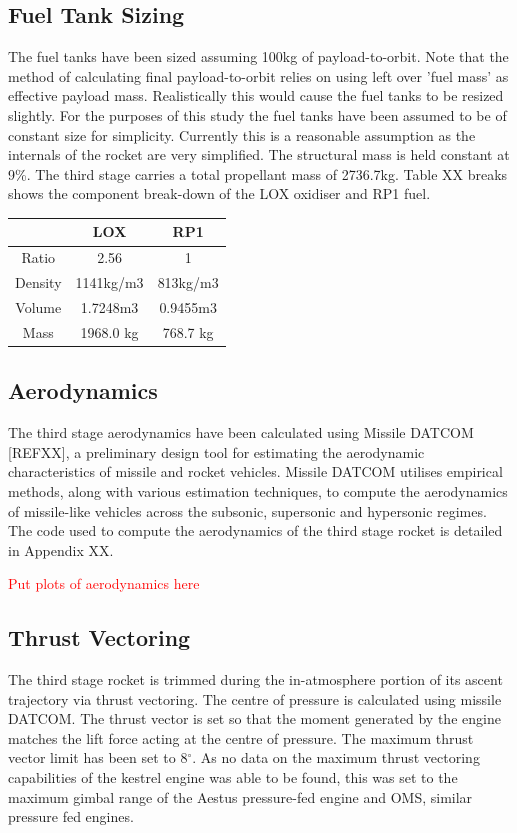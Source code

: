 		\subsection{Fuel Tank Sizing}
		The fuel tanks have been sized assuming 100kg of payload-to-orbit. Note that the method of calculating final payload-to-orbit relies on using left over 'fuel mass' as effective payload mass. Realistically this would cause the fuel tanks to be resized slightly. For the purposes of this study the fuel tanks have been assumed to be of constant size for simplicity. Currently this is a reasonable assumption as the internals of the rocket are very simplified. The structural mass is held constant at 9\%. The third stage carries a total propellant mass of 2736.7kg. Table XX breaks shows the component break-down of the LOX oxidiser and RP1 fuel.  
		
\begin{tabular}{|c|c|c|}
	\hline  & \textbf{LOX} & \textbf{RP1} \\ 
	\hline Ratio & 2.56 & 1 \\ 
	\hline Density & 1141kg/m3 & 813kg/m3 \cite{Magee}\\ 
	\hline Volume & 1.7248m3 & 0.9455m3 \\ 
	\hline Mass & 1968.0 kg & 768.7 kg \\ 
	\hline 
\end{tabular} 
		
		
		
		
		
		
		\subsection{Aerodynamics}
		
		The third stage aerodynamics have been calculated using Missile DATCOM [REFXX], a preliminary design tool for estimating the aerodynamic characteristics of missile and rocket vehicles. Missile DATCOM utilises empirical methods, along with various estimation techniques, to compute the aerodynamics of missile-like vehicles across the subsonic, supersonic and hypersonic regimes.  The code used to compute the aerodynamics of the third stage rocket is detailed in Appendix XX.  
		
		\textcolor{red}{Put plots of aerodynamics here}
		
		\subsection{Thrust Vectoring}
		
		The third stage rocket is trimmed during the in-atmosphere portion of its ascent trajectory via thrust vectoring. The centre of pressure is calculated using missile DATCOM. The thrust vector is set so that the moment generated by the engine matches the lift force acting at the centre of pressure. The maximum thrust vector limit has been set to 8$^\circ$. As no data on the maximum thrust vectoring capabilities of the kestrel engine was able to be found, this was set to the maximum gimbal range of the Aestus pressure-fed engine and OMS, similar pressure fed engines. 
		
		
		